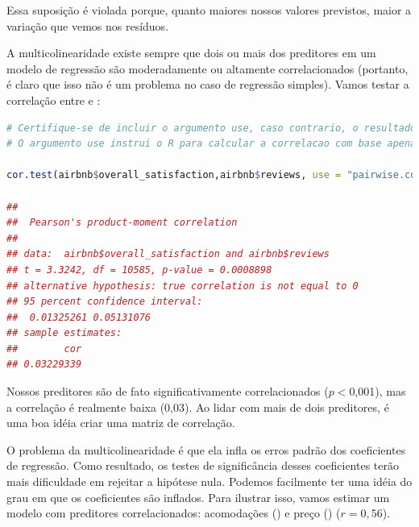 \documentclass{article}
\begin{document}
Essa suposição é violada porque, quanto maiores nossos valores previstos, maior a variação que vemos nos resíduos.

\newpage


\vspace{.25cm}

A multicolinearidade existe sempre que dois ou mais dos preditores em um modelo de regressão são moderadamente ou altamente correlacionados (portanto, é claro que isso não é um problema no caso de regressão simples). Vamos testar a correlação entre  e :

\begin{lstlisting}[language=R]
# Certifique-se de incluir o argumento use, caso contrario, o resultado sera NA devido aos valores ausentes no overall_satisfaction.
# O argumento use instrui o R para calcular a correlacao com base apenas nas observacoes para as quais temos dados sobre price e overall_satisfaction.

cor.test(airbnb$overall_satisfaction,airbnb$reviews, use = "pairwise.complete.obs") # teste para correlacao

## 
##  Pearson's product-moment correlation
## 
## data:  airbnb$overall_satisfaction and airbnb$reviews
## t = 3.3242, df = 10585, p-value = 0.0008898
## alternative hypothesis: true correlation is not equal to 0
## 95 percent confidence interval:
##  0.01325261 0.05131076
## sample estimates:
##        cor 
## 0.03229339
\end{lstlisting}

Nossos preditores são de fato significativamente correlacionados ($p <$0,001), mas a correlação é realmente baixa (0,03). Ao lidar com mais de dois preditores, é uma boa idéia criar uma matriz de correlação.

O problema da multicolinearidade é que ela infla os erros padrão dos coeficientes de regressão. Como resultado, os testes de significância desses coeficientes terão mais dificuldade em rejeitar a hipótese nula. Podemos facilmente ter uma idéia do grau em que os coeficientes são inflados. Para ilustrar isso, vamos estimar um modelo com preditores correlacionados: acomodações () e preço () ($r = 0,56$).
\end{document}
